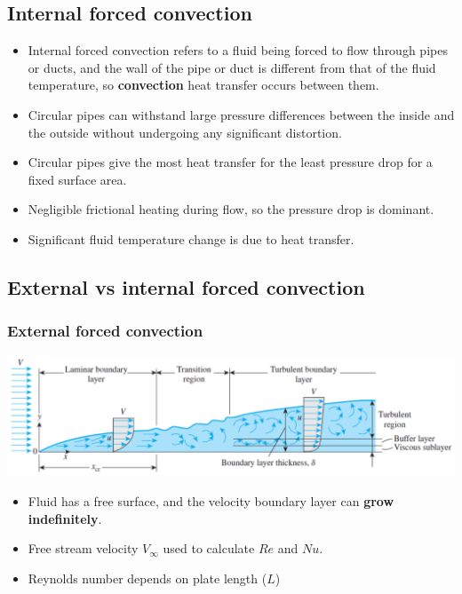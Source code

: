 \documentclass[11pt]{article}
\begin{document}
\subsection{Internal forced convection}
\label{sec:org98b66ef}
\begin{itemize}
\item Internal forced convection refers to a fluid being forced to flow through pipes or ducts, and the wall of the pipe or duct is different from that of the fluid temperature, so \textbf{convection} heat transfer occurs between them.
\item Circular pipes can withstand large pressure differences between the inside and the outside without undergoing any significant distortion.
\item Circular pipes give the most heat transfer for the least pressure drop for a fixed surface area.
\item Negligible frictional heating during flow, so the pressure drop is dominant.
\item Significant fluid temperature change is due to heat transfer.
\end{itemize}

 \newpage
\subsection{External vs internal forced convection}
\label{sec:org4d4111b}

\subsubsection{External forced convection}
\label{sec:org2d37c57}
\begin{center}
\includegraphics[width=.9\linewidth]{./images/reynolds-number-diagram.png}
\end{center}
\begin{itemize}
\item Fluid has a free surface, and the velocity boundary layer can \textbf{grow indefinitely}.
\item Free stream velocity \(V_{\infty}\) used to calculate \(Re\) and \(Nu\).
\item Reynolds number depends on plate length (\(L\))
\end{itemize}
\end{document}
